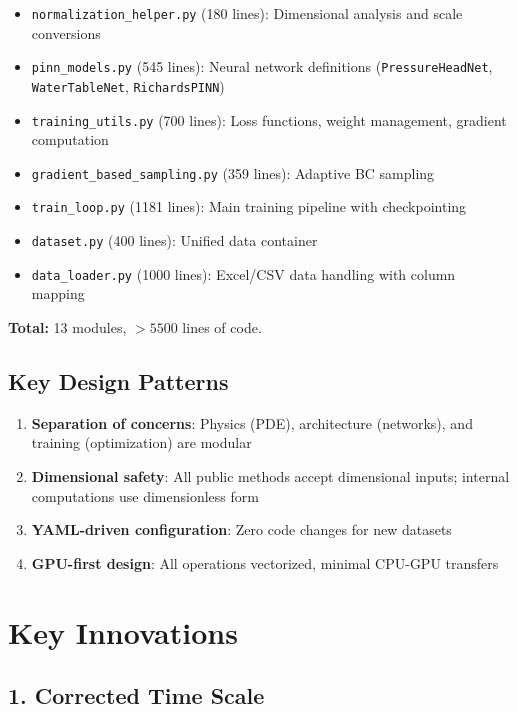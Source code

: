 \documentclass[11pt,a4paper]{article}
\begin{document}
\begin{itemize}
    \item \texttt{normalization\_helper.py} (180 lines): Dimensional analysis and scale conversions
    \item \texttt{pinn\_models.py} (545 lines): Neural network definitions (\texttt{PressureHeadNet}, \texttt{WaterTableNet}, \texttt{RichardsPINN})
    \item \texttt{training\_utils.py} (700 lines): Loss functions, weight management, gradient computation
    \item \texttt{gradient\_based\_sampling.py} (359 lines): Adaptive BC sampling
    \item \texttt{train\_loop.py} (1181 lines): Main training pipeline with checkpointing
    \item \texttt{dataset.py} (400 lines): Unified data container
    \item \texttt{data\_loader.py} (1000 lines): Excel/CSV data handling with column mapping
\end{itemize}

\textbf{Total:} 13 modules, $>5500$ lines of code.

\subsection{Key Design Patterns}

\begin{enumerate}
    \item \textbf{Separation of concerns}: Physics (PDE), architecture (networks), and training (optimization) are modular
    \item \textbf{Dimensional safety}: All public methods accept dimensional inputs; internal computations use dimensionless form
    \item \textbf{YAML-driven configuration}: Zero code changes for new datasets
    \item \textbf{GPU-first design}: All operations vectorized, minimal CPU-GPU transfers
\end{enumerate}

\section{Key Innovations}

\subsection{1. Corrected Time Scale}
\end{document}
